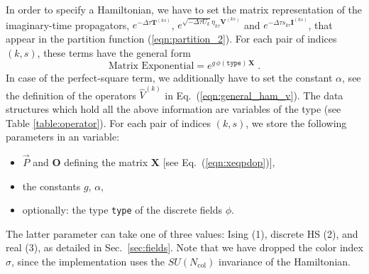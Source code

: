 In order to specify a Hamiltonian, we have to set the matrix representation of the imaginary-time propagators,
$ e^{-\Delta \tau {\bm T}^{(ks)}}$, $e^{  \sqrt{- \Delta \tau  U_k} \eta_{k\tau} {\bm V}^{(ks)} }$ and $e^{  -\Delta \tau s_{k\tau}  {\bm I}^{(ks)}}$, that appear in the 
partition function (\ref{eqn:partition_2}).  For each pair of indices $(k,s)$, these terms have the general form
\begin{equation}\label{eqn:exponent_mat}
\text{Matrix Exponential}=
e^{g \,\phi(\texttt{type})\,\bm{X} }\;.
\end{equation}
In case of the  perfect-square term,  we additionally have to set the constant $\alpha$, see the definition of the operators $\hat{V}^{(k)}$ in Eq.~(\ref{eqn:general_ham_v}).
The data structures which hold all the above information are variables of the type  (see Table \ref{table:operator}). 
For each pair of indices $(k,s)$, we store the following parameters in an  variable:
\begin{itemize}
\item $\vec{P}$ and   $ \bm{O}$   defining the matrix $\bm{X}$ [see Eq.~(\ref{eqn:xeqpdop})],
\item the constants $g$, $\alpha$,
\item optionally: the type \texttt{type} of the discrete fields $\phi$.
\end{itemize}
The latter parameter can take one of three values: Ising (1), discrete HS (2), and real (3), as detailed in Sec.~\ref{sec:fields}.
Note that we have dropped the color index $\sigma$, since the implementation uses the $SU(N_{\mathrm{col}})$ invariance of the Hamiltonian. 

